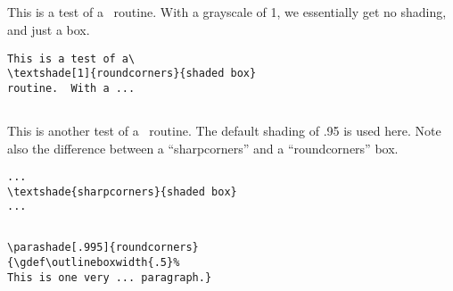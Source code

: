 {%
%
\subsection{}
  \noindent\begin{minipage}{3in}
    This is a test of a\  routine.
    With a grayscale of 1, we essentially get no shading, and just a box.
  \end{minipage}\hspace{.25in}\begin{minipage}{3in}
    \begin{verbatim}
This is a test of a\
\textshade[1]{roundcorners}{shaded box}
routine.  With a ...
     \end{verbatim}\end{minipage}

%
%
\subsection{}
  \noindent\begin{minipage}{3in}
    This is another test of a\ 
    routine.  The default shading of .95 is used here.  Note also the
    difference between a ``sharpcorners'' and a ``roundcorners'' box.
  \end{minipage}\hspace{.25in}\begin{minipage}{3in}
\begin{verbatim}
...
\textshade{sharpcorners}{shaded box}
...
\end{verbatim}
\end{minipage}

%
%
\subsection{}
\noindent\begin{minipage}{3in}
 \end{minipage}\hspace{.25in}
\begin{minipage}{3in}

\begin{verbatim}
\parashade[.995]{roundcorners}
{\gdef\outlineboxwidth{.5}%
This is one very ... paragraph.}
\end{verbatim}\end{minipage}

}
